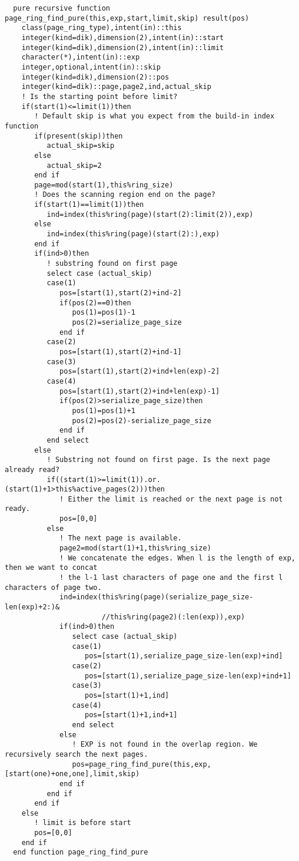 \begin{Verbatim}
  pure recursive function page_ring_find_pure(this,exp,start,limit,skip) result(pos)
    class(page_ring_type),intent(in)::this
    integer(kind=dik),dimension(2),intent(in)::start
    integer(kind=dik),dimension(2),intent(in)::limit
    character(*),intent(in)::exp
    integer,optional,intent(in)::skip
    integer(kind=dik),dimension(2)::pos
    integer(kind=dik)::page,page2,ind,actual_skip
    ! Is the starting point before limit?
    if(start(1)<=limit(1))then
       ! Default skip is what you expect from the build-in index function
       if(present(skip))then
          actual_skip=skip
       else
          actual_skip=2
       end if
       page=mod(start(1),this%ring_size)
       ! Does the scanning region end on the page?
       if(start(1)==limit(1))then
          ind=index(this%ring(page)(start(2):limit(2)),exp)
       else
          ind=index(this%ring(page)(start(2):),exp)
       end if
       if(ind>0)then
          ! substring found on first page
          select case (actual_skip)
          case(1)
             pos=[start(1),start(2)+ind-2]
             if(pos(2)==0)then
                pos(1)=pos(1)-1
                pos(2)=serialize_page_size
             end if
          case(2)
             pos=[start(1),start(2)+ind-1]
          case(3)
             pos=[start(1),start(2)+ind+len(exp)-2]
          case(4)
             pos=[start(1),start(2)+ind+len(exp)-1]
             if(pos(2)>serialize_page_size)then
                pos(1)=pos(1)+1
                pos(2)=pos(2)-serialize_page_size
             end if
          end select
       else
          ! Substring not found on first page. Is the next page already read?
          if((start(1)>=limit(1)).or.(start(1)+1>this%active_pages(2)))then
             ! Either the limit is reached or the next page is not ready.
             pos=[0,0]
          else
             ! The next page is available.
             page2=mod(start(1)+1,this%ring_size)
             ! We concatenate the edges. When l is the length of exp, then we want to concat
             ! the l-1 last characters of page one and the first l characters of page two.
             ind=index(this%ring(page)(serialize_page_size-len(exp)+2:)&
                       //this%ring(page2)(:len(exp)),exp)
             if(ind>0)then
                select case (actual_skip)
                case(1)
                   pos=[start(1),serialize_page_size-len(exp)+ind]
                case(2)
                   pos=[start(1),serialize_page_size-len(exp)+ind+1]
                case(3)
                   pos=[start(1)+1,ind]
                case(4)
                   pos=[start(1)+1,ind+1]
                end select
             else
                ! EXP is not found in the overlap region. We recursively search the next pages.
                pos=page_ring_find_pure(this,exp,[start(one)+one,one],limit,skip)
             end if
          end if
       end if
    else
       ! limit is before start
       pos=[0,0]
    end if
  end function page_ring_find_pure
\end{Verbatim}

